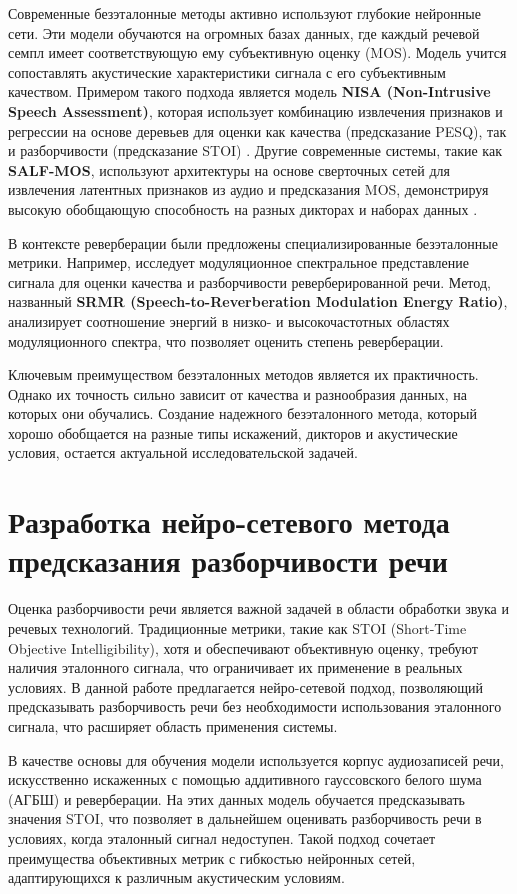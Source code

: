 \documentclass[oneside, final, 14pt]{extarticle}
\begin{document}
Современные безэталонные методы активно используют глубокие нейронные сети. Эти модели обучаются на огромных базах данных, где каждый речевой семпл имеет соответствующую ему субъективную оценку (MOS). Модель учится сопоставлять акустические характеристики сигнала с его субъективным качеством. Примером такого подхода является модель \textbf{NISA (Non-Intrusive Speech Assessment)}, которая использует комбинацию извлечения признаков и регрессии на основе деревьев для оценки как качества (предсказание PESQ), так и разборчивости (предсказание STOI) \cite{Sharma2016}. Другие современные системы, такие как \textbf{SALF-MOS}, используют архитектуры на основе сверточных сетей для извлечения латентных признаков из аудио и предсказания MOS, демонстрируя высокую обобщающую способность на разных дикторах и наборах данных \cite{Agrawal2025}.

В контексте реверберации были предложены специализированные безэталонные метрики. Например, \cite{Falk2010} исследует модуляционное спектральное представление сигнала для оценки качества и разборчивости реверберированной речи. Метод, названный \textbf{SRMR (Speech-to-Reverberation Modulation Energy Ratio)}, анализирует соотношение энергий в низко- и высокочастотных областях модуляционного спектра, что позволяет оценить степень реверберации.

Ключевым преимуществом безэталонных методов является их практичность. Однако их точность сильно зависит от качества и разнообразия данных, на которых они обучались. Создание надежного безэталонного метода, который хорошо обобщается на разные типы искажений, дикторов и акустические условия, остается актуальной исследовательской задачей.

\newpage
\section{Разработка нейро-сетевого метода предсказания разборчивости речи}

Оценка разборчивости речи является важной задачей в области обработки звука и речевых технологий. Традиционные метрики, такие как STOI (Short-Time Objective Intelligibility), хотя и обеспечивают объективную оценку, требуют наличия эталонного сигнала, что ограничивает их применение в реальных условиях. В данной работе предлагается нейро-сетевой подход, позволяющий предсказывать разборчивость речи без необходимости использования эталонного сигнала, что расширяет область применения системы.

В качестве основы для обучения модели используется корпус аудиозаписей речи, искусственно искаженных с помощью аддитивного гауссовского белого шума (АГБШ) и реверберации. На этих данных модель обучается предсказывать значения STOI, что позволяет в дальнейшем оценивать разборчивость речи в условиях, когда эталонный сигнал недоступен. Такой подход сочетает преимущества объективных метрик с гибкостью нейронных сетей, адаптирующихся к различным акустическим условиям.
\end{document}
